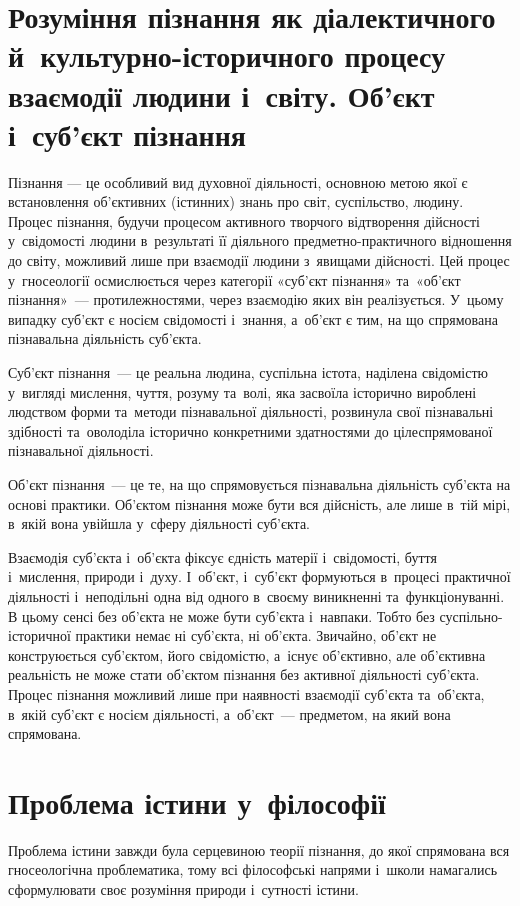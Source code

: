 \documentclass[a5paper,oneside,DIV=12,12pt,headings=small]{scrartcl}
\begin{document}
	\section{Розуміння пізнання як діалектичного й~куль\-тур\-но-іс\-то\-рич\-но\-го процесу взаємодії людини і~світу. Об'\-єкт і~суб'\-єкт пізнання}
		Пізнання — це особливий вид духовної діяльності, основною метою якої є встановлення об'\-єк\-тив\-них (істинних) знань про світ, суспільство, людину. Процес пізнання, будучи процесом активного творчого відтворення дійсності у~свідомості людини в~результаті її діяльного предметно-практичного відношення до світу, можливий лише при взаємодії людини з~явищами дійсності. Цей процес у~гносеології осмислюється через категорії «суб'\-єкт пізнання» та~«об'\-єкт пізнання»~— протилежностями, через взаємодію яких він реалізується. У~цьому випадку суб'\-єкт є носієм свідомості і~знання, а~об'\-єкт є тим, на що спрямована пізнавальна діяльність суб'\-єкта.

		Суб'\-єкт пізнання~— це реальна людина, суспільна істота, наділена свідомістю у~вигляді мислення, чуття, розуму та~волі, яка засвоїла історично вироблені людством форми та~методи пізнавальної діяльності, розвинула свої пізнавальні здібності та~оволоділа історично конкретними здатностями до цілеспрямованої пізнавальної діяльності.

		Об'\-єкт пізнання~— це те, на що спрямовується пізнавальна діяльність суб'\-єкта на основі практики. Об'\-єк\-том пізнання може бути вся дійсність, але лише в~тій мірі, в~якій вона увійшла у~сферу діяльності суб'\-єкта.

		Взаємодія суб'\-єкта і~об'\-єк\-та фіксує єдність матерії і~свідомості, буття і~мислення, природи і~духу. І~об'\-єкт, і~суб'\-єкт формуються в~процесі практичної діяльності і~неподільні одна від одного в~своєму виникненні та~функціонуванні. В цьому сенсі без об'\-єк\-та не може бути суб'\-єкта і~навпаки. Тобто без суспільно-історичної практики немає ні суб'\-єкта, ні об'\-єк\-та. Звичайно, об'\-єкт не конструюється суб'\-єктом, його свідомістю, а~існує об'\-єк\-тив\-но, але об'\-єк\-тив\-на реальність не може стати об'\-єк\-том пізнання без активної діяльності суб'\-єк\-та. Процес пізнання можливий лише при наявності взаємодії суб'\-єк\-та та~об'\-єк\-та, в~якій суб'\-єкт є носієм діяльності, а~об'\-єкт~— предметом, на який вона спрямована.

	\section{Проблема істини у~філософії}
		Проблема істини завжди була серцевиною теорії пізнання, до якої спрямована вся гносеологічна проблематика, тому всі філософські напрями і~школи намагались сформулювати своє розуміння природи і~сутності істини.
\end{document}

